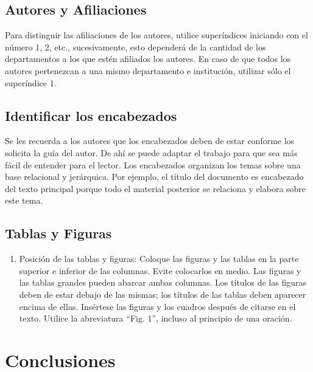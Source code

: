            \subsection{Autores y Afiliaciones}
            
            Para distinguir las afiliaciones de los autores, utilice superíndices iniciando con el número 1, 2, etc., sucesivamente, esto dependerá de la cantidad de los departamentos a los que estén afiliados los autores. En caso de que todos los autores pertenezcan a una mismo departamento e institución, utilizar sólo el superíndice 1. 
            
            \subsection{Identificar los encabezados}
            
            Se les recuerda a los autores que los encabezados deben de estar conforme los solicita la guía del autor. De ahí se puede adaptar el trabajo para que sea más fácil de entender para el lector.
            Los encabezados organizan los temas sobre una base relacional y jerárquica. Por ejemplo, el título del documento es encabezado del texto principal porque todo el material posterior se relaciona y elabora sobre este tema. 
            
            \subsection{Tablas y Figuras}
            
            \begin{enumerate}
                \item Posición de las tablas y figuras: Coloque las figuras y las tablas en la parte superior e inferior de las columnas. Evite colocarlos en medio. Las figuras y las tablas grandes pueden abarcar ambas columnas. Los títulos de las figuras deben de estar debajo de las mismas; los títulos de las tablas deben aparecer encima de ellas. Insértese las figuras y los cuadros después de citarse en el texto. Utilice la abreviatura “Fig. 1”, incluso al principio de una oración. 
            \end{enumerate}
            
            \section{Conclusiones}
            
